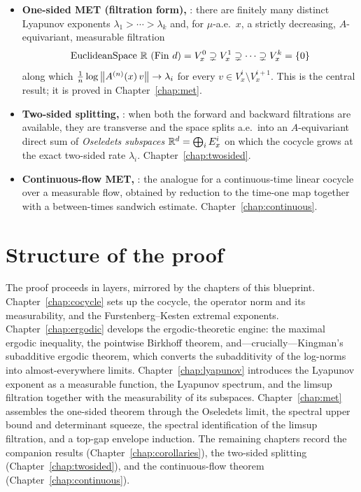 \begin{itemize}
  \item \textbf{One-sided MET (filtration form),} : there
    are finitely many distinct Lyapunov exponents \(\lambda_1 > \cdots > \lambda_k\) and,
    for \(\mu\)-a.e.\ \(x\), a strictly decreasing, \(A\)-equivariant, measurable filtration
    \[
      \mathrm{EuclideanSpace}\ \mathbb{R}\ (\mathrm{Fin}\ d) = V^0_x \supsetneq V^1_x \supsetneq
      \cdots \supsetneq V^k_x = \{0\}
    \]
    along which \(\tfrac1n \log\left\lVert A^{(n)}(x)\,v \right\rVert \to \lambda_i\) for every
    \(v \in V^i_x \setminus V^{i+1}_x\). This is the central result; it is proved in
    Chapter~\ref{chap:met}.
  \item \textbf{Two-sided splitting,} : when both the
    forward and backward filtrations are available, they are transverse and the space
    splits a.e.\ into an \(A\)-equivariant direct sum of \emph{Oseledets subspaces}
    \(\mathbb{R}^d = \bigoplus_i E^i_x\) on which the cocycle grows at the exact two-sided rate
    \(\lambda_i\). Chapter~\ref{chap:twosided}.
  \item \textbf{Continuous-flow MET,} : the analogue for a
    continuous-time linear cocycle over a measurable flow, obtained by reduction to the
    time-one map together with a between-times sandwich estimate. Chapter~\ref{chap:continuous}.
\end{itemize}

\section{Structure of the proof}

The proof proceeds in layers, mirrored by the chapters of this blueprint.
Chapter~\ref{chap:cocycle} sets up the cocycle, the operator norm and its measurability,
and the Furstenberg--Kesten extremal exponents. Chapter~\ref{chap:ergodic} develops the
ergodic-theoretic engine: the maximal ergodic inequality, the pointwise Birkhoff theorem,
and---crucially---Kingman's subadditive ergodic theorem, which converts the subadditivity
of the log-norms into almost-everywhere limits. Chapter~\ref{chap:lyapunov} introduces the
Lyapunov exponent as a measurable function, the Lyapunov spectrum, and the limsup
filtration together with the measurability of its subspaces. Chapter~\ref{chap:met}
assembles the one-sided theorem through the Oseledets limit, the spectral upper bound and
determinant squeeze, the spectral identification of the limsup filtration, and a top-gap
envelope induction. The remaining chapters record the companion results
(Chapter~\ref{chap:corollaries}), the two-sided splitting (Chapter~\ref{chap:twosided}),
and the continuous-flow theorem (Chapter~\ref{chap:continuous}).
